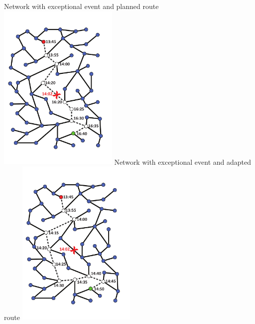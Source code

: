 {  \createsubfigure%
  {Network with exceptional event and planned route}%
  {\includegraphics[width=0.43\textwidth, angle=0]{extending/figures/WithinDayReplanning/network_original_route_with_event}}%
  {\label{fig:labelNetworkExceptionalEventPlannedRoute}}%
  {\qquad}%
  \createsubfigure%
  {Network with exceptional event and adapted route}%
  {\includegraphics[width=0.43\textwidth, angle=0]{extending/figures/WithinDayReplanning/network_adapted_route_with_event}}%
  {\label{fig:labelNetworkExceptionalEventAdaptedRoute}}%
  {}%
}%
{}

